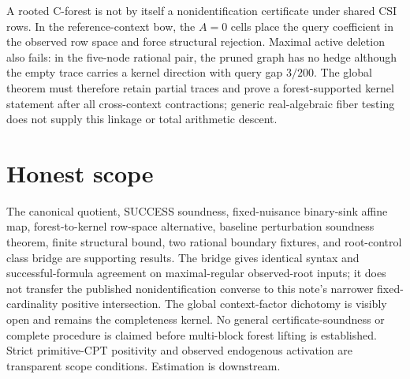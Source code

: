 \documentclass{article}
\begin{document}
A rooted C-forest is not by itself a nonidentification certificate under shared CSI rows. In the reference-context bow, the \(A=0\) cells place the query coefficient in the observed row space and force structural rejection. Maximal active deletion also fails: in the five-node rational pair, the pruned graph has no hedge although the empty trace carries a kernel direction with query gap \(3/200\). The global theorem must therefore retain partial traces and prove a forest-supported kernel statement after all cross-context contractions; generic real-algebraic fiber testing does not supply this linkage or total arithmetic descent.

\section{Honest scope}

The canonical quotient, SUCCESS soundness, fixed-nuisance binary-sink affine map, forest-to-kernel row-space alternative, baseline perturbation soundness theorem, finite structural bound, two rational boundary fixtures, and root-control class bridge are supporting results. The bridge gives identical syntax and successful-formula agreement on maximal-regular observed-root inputs; it does not transfer the published nonidentification converse to this note's narrower fixed-cardinality positive intersection. The global context-factor dichotomy is visibly open and remains the completeness kernel. No general certificate-soundness or complete procedure is claimed before multi-block forest lifting is established. Strict primitive-CPT positivity and observed endogenous activation are transparent scope conditions. Estimation is downstream.
\end{document}
